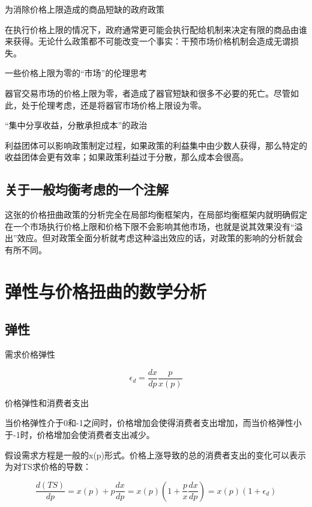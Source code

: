 \documentclass{article}
\begin{document}
\hspace*{\fill}

为消除价格上限造成的商品短缺的政府政策

在执行价格上限的情况下，政府通常更可能会执行配给机制来决定有限的商品由谁来获得。无论什么政策都不可能改变一个事实：干预市场价格机制会造成无谓损失。

\hspace*{\fill}

一些价格上限为零的“市场”的伦理思考

器官交易市场的价格上限为零，者造成了器官短缺和很多不必要的死亡。尽管如此，处于伦理考虑，还是将器官市场价格上限设为零。

\hspace*{\fill}

“集中分享收益，分散承担成本”的政治

利益团体可以影响政策制定过程，如果政策的利益集中由少数人获得，那么特定的收益团体会更有效率；如果政策利益过于分散，那么成本会很高。

\subsection{关于一般均衡考虑的一个注解}

这张的价格扭曲政策的分析完全在局部均衡框架内，在局部均衡框架内就明确假定在一个市场执行价格上限和价格下限不会影响其他市场，也就是说其效果没有“溢出”效应。但对政策全面分析就考虑这种溢出效应的话，对政策的影响的分析就会有所不同。

\section{弹性与价格扭曲的数学分析}

\subsection{弹性}

需求价格弹性

\[
\epsilon_d=\frac{dx}{dp}\frac{p}{x(p)}
\]

\hspace*{\fill}

价格弹性和消费者支出

当价格弹性介于0和-1之间时，价格增加会使得消费者支出增加，而当价格弹性小于-1时，价格增加会使消费者支出减少。

假设需求方程是一般的x(p)形式。价格上涨导致的总的消费者支出的变化可以表示为对TS求价格的导数：

\[
\frac{d(TS)}{dp}=x(p)+p\frac{dx}{dp}=x(p)(1+\frac{p}{x}\frac{dx}{dp})=x(p)(1+\epsilon_d)
\]
\end{document}
